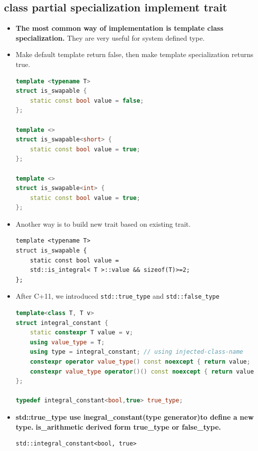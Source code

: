 \documentclass[a4paper,11pt,twoside]{book}
\begin{document}
\subsection{class partial specialization implement trait}
\begin{itemize}
	
	
	\item \textbf{The most common way of implementation is template class specialization.} They are very useful for system defined type. 
	
	\item Make default template return false, then make template specialization returns true. 
\begin{lstlisting}[frame=single, language=c++]
template <typename T>
struct is_swapable {
	static const bool value = false;
};

template <>
struct is_swapable<short> {
	static const bool value = true;
};

template <>
struct is_swapable<int> {
	static const bool value = true;
};
\end{lstlisting}

\item Another way is to build new trait based on existing trait.
\begin{lstlisting}[numbers=none]
template <typename T>
struct is_swapable {
	static const bool value = 
	std::is_integral< T >::value && sizeof(T)>=2;
};
\end{lstlisting}

	\item After C+11, we introduced \texttt{std::true\_type} and \texttt{std::false\_type}
\begin{lstlisting}[frame=single, language=c++]
template<class T, T v>
struct integral_constant {
	static constexpr T value = v;
	using value_type = T;
	using type = integral_constant; // using injected-class-name
	constexpr operator value_type() const noexcept { return value; }
	constexpr value_type operator()() const noexcept { return value; } //since c++14
};
	
typedef integral_constant<bool,true> true_type;
\end{lstlisting}


\item \textbf{std::true\_type use inegral\_constant(type generator)to define a new type.} \newline 
\textbf{is\_arithmetic derived form true\_type or false\_type.}
\begin{lstlisting}[numbers=none]
std::integral_constant<bool, true>


\end{lstlisting}
\end{itemize}
\end{document}
